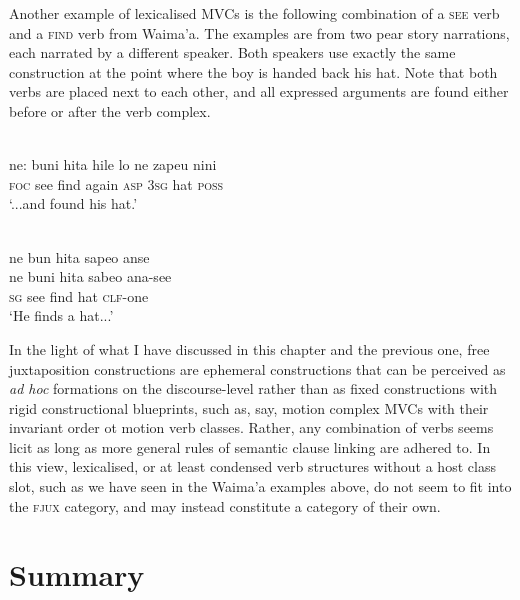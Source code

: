 Another example of lexicalised MVCs is the following combination of a \textsc{see} verb and a \textsc{find} verb from Waima'a. The examples are from two pear story narrations, each narrated by a different speaker. Both speakers use exactly the same construction at the point where the boy is handed back his hat. Note that both verbs are placed next to each other, and all expressed arguments are found either before or after the verb complex.

\ea \label{}
\\
\gll ne: buni hita hile lo ne zapeu nini \\
\textsc{foc} see find again \textsc{asp} 3\textsc{sg} hat \textsc{poss} \\
\glft `...and found his hat.'\\ 
\z

\ea \label{}
\\
\glll ne bun hita sapeo anse \\
ne buni hita sabeo ana-see \\
\textsc{sg} see find hat \textsc{clf}-one \\
\glft `He finds a hat...' \\ 
\z

In the light of what I have discussed in this chapter and the previous one, free juxtaposition constructions are ephemeral constructions that can be perceived as \textit{ad hoc} formations on the discourse-level rather than as fixed constructions with rigid constructional blueprints, such as, say, motion complex MVCs with their invariant order ot motion verb classes. Rather, any combination of verbs seems licit as long as more general rules of semantic clause linking are adhered to. In this view, lexicalised, or at least condensed verb structures without a host class slot, such as we have seen in the Waima'a examples above, do not seem to fit into the \textsc{fjux} category, and may instead constitute a category of their own.

\section{Summary}

